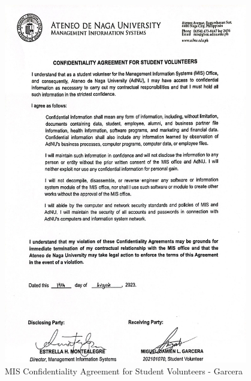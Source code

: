 \begin{figure}[H]
    \centering
    \includegraphics[width=0.95\textwidth]{figures/images/nda/mis-nda-garcera.JPG}
    \caption{MIS Confidentiality Agreement for Student Volunteers - Garcera}
    \label{fig:mis-nda-garcera}
\end{figure}

